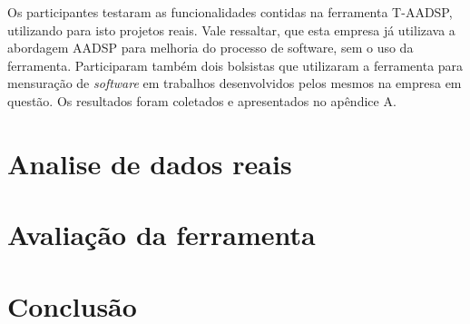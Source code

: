 \documentclass{acm_proc_article-sp}
\begin{document}
Os participantes testaram as funcionalidades contidas na ferramenta T-AADSP, utilizando para isto projetos reais. Vale ressaltar, que esta empresa já utilizava a abordagem AADSP para melhoria do processo de software, sem o uso da ferramenta. Participaram também dois bolsistas que utilizaram a ferramenta para mensuração de \textit{software} em trabalhos desenvolvidos pelos mesmos na empresa em questão. Os resultados foram coletados e apresentados no apêndice A.

\section{Analise de dados reais}

\section{Avaliação da ferramenta}


\section{Conclusão}





\end{document}

